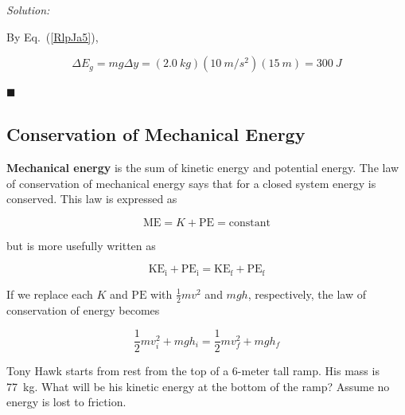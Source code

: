 \documentclass[dvipsnames]{article}
\begin{document}
\textit{Solution:} 

By Eq.~(\ref{RlpJa5}),

\begin{equation*}
    \Delta E_g = mg \Delta y = (\SI{2.0}{kg})(\SI{10}{m/s^2})(\SI{15}{m}) =  \boxed{\SI{300}{J}}
\end{equation*}

\hfill $\blacksquare$




\clearpage

\subsection{Conservation of Mechanical Energy} \label{KRxiCV}

\textbf{Mechanical energy} is the sum of kinetic energy and potential energy. The law of conservation of mechanical energy says that for a closed system energy is conserved. This law is expressed as

\begin{equation} \label{QyLUh5}
    \mathrm{ME} = K + \mathrm{PE} = \mathrm{constant}
\end{equation}

but is more usefully written as

\begin{equation} \label{yOUj22}
    \mathrm{KE_i} + \mathrm{PE_i} = \mathrm{KE_f} + \mathrm{PE_f}
\end{equation}

If we replace each $K$ and $\mathrm{PE}$ with $\frac{1}{2}mv^2$ and $mgh$, respectively, the law of conservation of energy becomes

\begin{equation} \label{ZSmSin}
    \frac{1}{2} m v_i^2 + mgh_i  = 
    \frac{1}{2} m v_f^2 + mgh_f 
\end{equation}

\begin{example} \label{mUfgIz}
Tony Hawk starts from rest from the top of a 6-meter tall ramp. His mass is \SI{77}{kg}. What will be his kinetic energy at the bottom of the ramp? Assume no energy is lost to friction.


\begin{center}
\end{center}
\end{example} 
\end{document}
